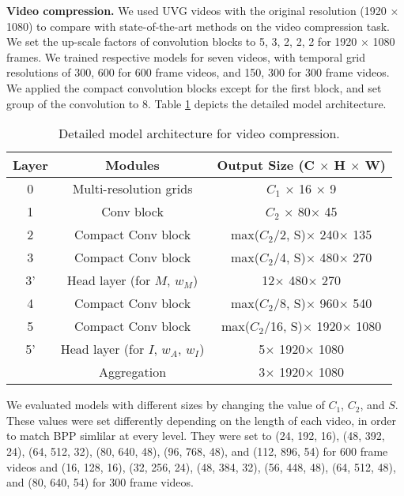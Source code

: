 \documentclass[sigconf]{acmart}
\begin{document}
\noindent\textbf{Video compression.}
We used UVG videos with the original resolution (1920 × 1080) to compare with state-of-the-art methods on the video compression task.
We set the up-scale factors of convolution blocks to 5, 3, 2, 2, 2 for 1920 × 1080 frames.
We trained respective models for seven videos, with temporal grid resolutions of 300, 600 for 600 frame videos, and 150, 300 for 300 frame videos.
We applied the compact convolution blocks except for the first block, and set group of the convolution to 8.
Table \ref{tab_co} depicts the detailed model architecture.

\begin{table}[ht]
\centering
\caption{Detailed model architecture for video compression.}
\vskip 0.1in
\begin{tabular}{c|c|c}
\hline
Layer & Modules                    & Output Size (C $\times$ H $\times$ W)    \\ \hline\hline
0     & Multi-resolution grids     & $C_1$ $\times$ 16 $\times$ 9                 \\
1     & Conv block                 & $C_2$ $\times$ 80$\times$ 45                \\
2     & Compact Conv block              & max($C_2$/2, S)$\times$ 240$\times$ 135    \\
3     & Compact Conv block              & max($C_2$/4, S)$\times$ 480$\times$ 270    \\
3'    & Head layer (for $M$, $w_M$)     & 12$\times$ 480$\times$ 270             \\
4     & Compact Conv block              & max($C_2$/8, S)$\times$ 960$\times$ 540    \\
5     & Compact Conv block              & max($C_2$/16, S)$\times$ 1920$\times$ 1080 \\
5'    & Head layer (for $I$, $w_A$, $w_I$) & 5$\times$ 1920$\times$ 1080  \\       
& Aggregation & 3$\times$ 1920$\times$ 1080 \\
\hline
\end{tabular}
\label{tab_co}
\end{table}

We evaluated models with different sizes by changing the value of $C_1$, $C_2$, and $S$.
These values were set differently depending on the length of each video, in order to match BPP simlilar at every level.
They were set to (24, 192, 16), (48, 392, 24), (64, 512, 32), (80, 640, 48), (96, 768, 48), and (112, 896, 54) for 600 frame videos and (16, 128, 16), (32, 256, 24), (48, 384, 32), (56, 448, 48), (64, 512, 48), and (80, 640, 54) for 300 frame videos.
\end{document}
